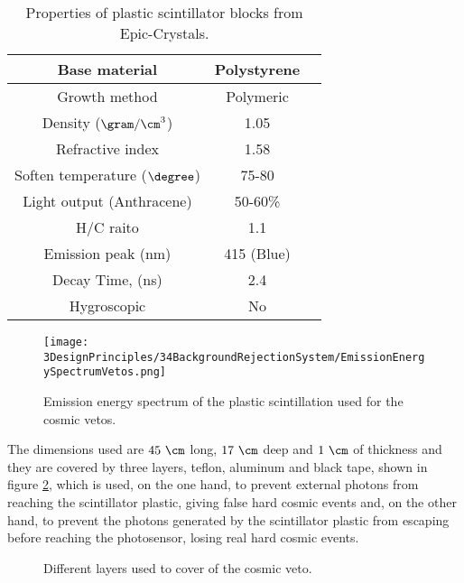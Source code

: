 \begin{table}[]
\begin{center}
\begin{tabular}{|c|c|c|}
\hline \hline 
Base material & Polystyrene \\ \hline
Growth method & Polymeric \\ \hline
Density ($\gram/\cm^3$)& 1.05 \\ \hline
Refractive index & 1.58 \\ \hline
Soften temperature ($\degree$) & 75-80 \\ \hline
Light output (Anthracene) & 50-60\% \\ \hline
H/C raito & 1.1 \\ \hline
Emission peak (nm) & 415 (Blue) \\ \hline
Decay Time, (ns) & 2.4 \\ \hline
Hygroscopic & No \\ \hline
\end{tabular}
\caption{Properties of plastic scintillator blocks from Epic-Crystals. \cite{ScintillatorVeto}}
\label{tab:ParametersScintillatorVeto}
\end{center}
\end{table}

\begin{figure}[]
\centering
\texttt{[image: 3DesignPrinciples/34BackgroundRejectionSystem/EmissionEnergySpectrumVetos.png]}
\caption{Emission energy spectrum of the plastic scintillation used for the cosmic vetos.\label{fig:EmissionEnergySpectrumVeto}~\cite{ScintillatorVeto}}
\end{figure}

The dimensions used are $45~\cm$ long, $17~\cm$ deep and $1~\cm$ of thickness and they are covered by three layers, teflon, aluminum and black tape, shown in figure \ref{fig:LayersVeto}, which is used, on the one hand, to prevent external photons from reaching the scintillator plastic, giving false hard cosmic events and, on the other hand, to prevent the photons generated by the scintillator plastic from escaping before reaching the photosensor, losing real hard cosmic events.

\begin{figure}[h]
 \centering
 \caption{Different layers used to cover of the cosmic veto.}
 \label{fig:LayersVeto}
\end{figure}


